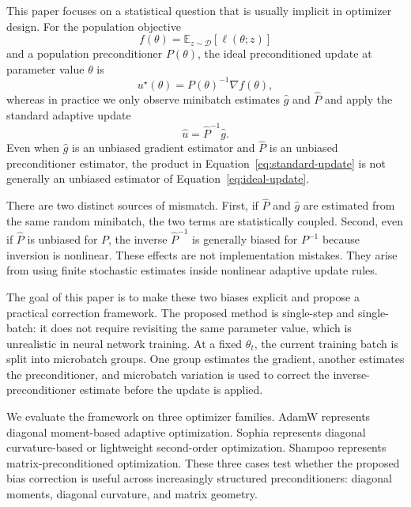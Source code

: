 \documentclass{article}
\newcommand{\E}{\mathbb{E}}
\newcommand{\D}{\mathcal{D}}
\begin{document}
This paper focuses on a statistical question that is usually implicit in optimizer design. For the population objective
\begin{equation}
    f(\theta) = \E_{z \sim \D}[\ell(\theta; z)]
\end{equation}
and a population preconditioner $P(\theta)$, the ideal preconditioned update at parameter value $\theta$ is
\begin{equation}
    u^\star(\theta) = P(\theta)^{-1} \nabla f(\theta),
    \label{eq:ideal-update}
\end{equation}
whereas in practice we only observe minibatch estimates $\hat g$ and $\hat P$ and apply the standard adaptive update
\begin{equation}
    \hat u = \hat P^{-1} \hat g.
    \label{eq:standard-update}
\end{equation}
Even when $\hat g$ is an unbiased gradient estimator and $\hat P$ is an unbiased preconditioner estimator, the product in Equation~\eqref{eq:standard-update} is not generally an unbiased estimator of Equation~\eqref{eq:ideal-update}.

There are two distinct sources of mismatch. First, if $\hat P$ and $\hat g$ are estimated from the same random minibatch, the two terms are statistically coupled. Second, even if $\hat P$ is unbiased for $P$, the inverse $\hat P^{-1}$ is generally biased for $P^{-1}$ because inversion is nonlinear. These effects are not implementation mistakes. They arise from using finite stochastic estimates inside nonlinear adaptive update rules.

The goal of this paper is to make these two biases explicit and propose a practical correction framework. The proposed method is single-step and single-batch: it does not require revisiting the same parameter value, which is unrealistic in neural network training. At a fixed $\theta_t$, the current training batch is split into microbatch groups. One group estimates the gradient, another estimates the preconditioner, and microbatch variation is used to correct the inverse-preconditioner estimate before the update is applied.

We evaluate the framework on three optimizer families. AdamW represents diagonal moment-based adaptive optimization. Sophia represents diagonal curvature-based or lightweight second-order optimization. Shampoo represents matrix-preconditioned optimization. These three cases test whether the proposed bias correction is useful across increasingly structured preconditioners: diagonal moments, diagonal curvature, and matrix geometry.
\end{document}
